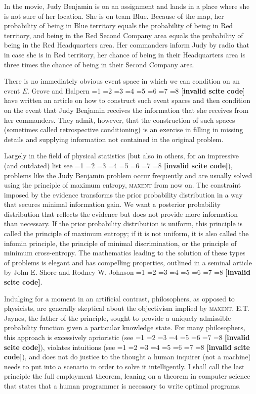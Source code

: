 \documentclass[12pt]{article}
\newif\ifNumericalOrYear
\newcommand{\PageP}{p.~}
\newcommand{\PageP}{}
\newcommand{\scite}[3]{\ifnum#1=1\ifNumericalOrYear\citep{#2}\else\citeyearpar{#2}\fi\else
\ifnum#1=2\ifNumericalOrYear\citep[#3]{#2}\else\citep[{\PageP}#3]{#2}\fi\else
\ifnum#1=3\ifNumericalOrYear(\citet[#3]{#2})\else\citep[{\PageP}#3]{#2}\fi\else
\ifnum#1=4\ifNumericalOrYear\citet{#2}\else\citet{#2}\fi\else
\ifnum#1=5\ifNumericalOrYear(\citet{#2})\else\citep{#2}\fi\else
\ifnum#1=6\ifNumericalOrYear(\citet[#3]{#2})\else\citep[{\PageP}#3]{#2}\fi\else
\ifnum#1=7\ifNumericalOrYear\citep{#2}\else\citealp{#2}\fi\else
\ifnum#1=8\ifNumericalOrYear\citep[#3]{#2}\else\citealp[{\PageP}#3]{#2}\fi\else
\textbf{[invalid scite code]}\fi\fi\fi\fi\fi\fi\fi\fi}
\begin{document}
In the movie, Judy Benjamin is on an assignment and lands in a place
where she is not sure of her location. She is on team Blue. Because of
the map, her probability of being in Blue territory equals the
probability of being in Red territory, and being in the Red Second
Company area equals the probability of being in the Red Headquarters
area. Her commanders inform Judy by radio that in case she is in Red
territory, her chance of being in their Headquarters area is three
times the chance of being in their Second Company area.

There is no immediately obvious event space in which we can condition
on an event $E$. Grove and Halpern \scite{1}{grovehalpern97}{} have
written an article on how to construct such event spaces and then
condition on the event that Judy Benjamin receives the information
that she receives from her commanders. They admit, however, that the
construction of such spaces (sometimes called retrospective
conditioning) is an exercise in filling in missing details and
supplying information not contained in the original problem.

Largely in the field of physical statistics (but also in others, for
an impressive (and outdated) list see \scite{8}{shorejohnson80}{26}),
problems like the Judy Benjamin problem occur frequently and are
usually solved using the principle of maximum entropy, \textsc{maxent}
from now on. The constraint imposed by the evidence transforms
the prior probability distribution in a way that secures minimal
information gain. We want a posterior probability distribution that
reflects the evidence but does not provide more information than
necessary. If the prior probability distribution is uniform, this
principle is called the principle of maximum entropy; if it is not
uniform, it is also called the infomin principle, the principle of
minimal discrimination, or the principle of minimum cross-entropy. The
mathematics leading to the solution of these types of problems is
elegant and has compelling properties, outlined in a seminal article
by John E. Shore and Rodney W. Johnson \scite{1}{shorejohnson80}{}.

Indulging for a moment in an artificial contrast, philosophers, as
opposed to physicists, are generally skeptical about the objectivism
implied by \textsc{maxent}. E.T. Jaynes, the father of the principle,
sought to provide a uniquely admissible probability function given a
particular knowledge state. For many philosophers, this approach is
excessively aprioristic (see \scite{8}{seidenfeld79}{414}), violates
intuitions (see \scite{7}{grovehalpern97}{}), and does not do justice
to the thought a human inquirer (not a machine) needs to put into a
scenario in order to solve it intelligently. I shall call the last
principle the full employment theorem, leaning on a theorem in
computer science that states that a human programmer is necessary to
write optimal programs. 
\end{document}
